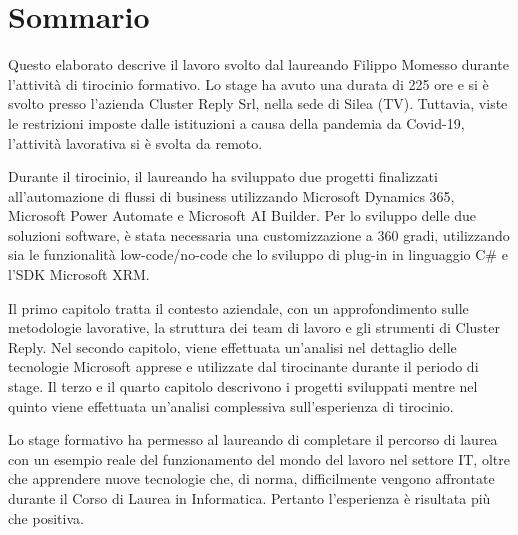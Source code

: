 \chapter*{Sommario} %
\label{sommario}

Questo elaborato descrive il lavoro svolto dal laureando Filippo Momesso durante l'attività di tirocinio formativo. Lo stage ha avuto una durata di 225 ore e si è svolto presso l'azienda Cluster Reply Srl, nella sede di Silea (TV). Tuttavia, viste le restrizioni imposte dalle istituzioni a causa della pandemia da Covid-19, l'attività lavorativa si è svolta da remoto.

Durante il tirocinio, il laureando ha sviluppato due progetti finalizzati all'automazione di flussi di business utilizzando Microsoft Dynamics 365, Microsoft Power Automate e Microsoft AI Builder. Per lo sviluppo delle due soluzioni software, è stata necessaria una customizzazione a \num{360} gradi, utilizzando sia le funzionalità low-code/no-code che lo sviluppo di plug-in in linguaggio C\# e l'SDK Microsoft XRM. 

Il primo capitolo tratta il contesto aziendale, con un approfondimento sulle metodologie lavorative, la struttura dei team di lavoro e gli strumenti di Cluster Reply. Nel secondo capitolo, viene effettuata un'analisi nel dettaglio delle tecnologie Microsoft apprese e utilizzate dal tirocinante durante il periodo di stage. 
Il terzo e il quarto capitolo descrivono i progetti sviluppati mentre nel quinto viene effettuata un'analisi complessiva sull'esperienza di tirocinio. 

Lo stage formativo ha permesso al laureando di completare il percorso di laurea con un esempio reale del funzionamento del mondo del lavoro nel settore IT, oltre che apprendere nuove tecnologie che, di norma, difficilmente vengono affrontate durante il Corso di Laurea in Informatica. Pertanto l'esperienza è risultata più che positiva. 


\newpage\null\newpage